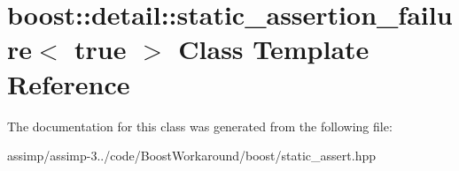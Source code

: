 \hypertarget{classboost_1_1detail_1_1static__assertion__failure_3_01true_01_4}{\section{boost\+:\+:detail\+:\+:static\+\_\+assertion\+\_\+failure$<$ true $>$ Class Template Reference}
\label{classboost_1_1detail_1_1static__assertion__failure_3_01true_01_4}
}


The documentation for this class was generated from the following file\+:\begin{DoxyCompactItemize}
\item 
assimp/assimp-\/3../code/\+Boost\+Workaround/boost/static\+\_\+assert.\+hpp\end{DoxyCompactItemize}
